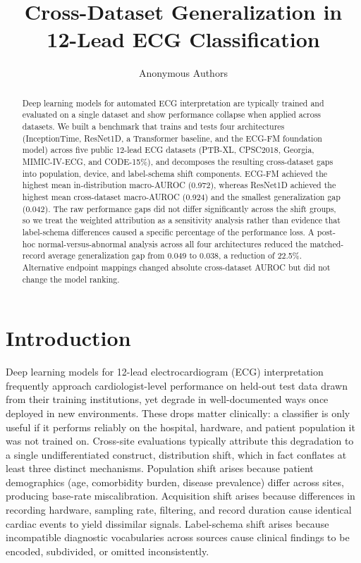\documentclass{article}
\title{Cross-Dataset Generalization in 12-Lead ECG Classification}
\author{Anonymous Authors}
\begin{document}
\maketitle

\begin{abstract}
Deep learning models for automated ECG interpretation are typically trained and evaluated on a single dataset and show performance collapse when applied across datasets. We built a benchmark that trains and tests four architectures (InceptionTime, ResNet1D, a Transformer baseline, and the ECG-FM foundation model) across five public 12-lead ECG datasets (PTB-XL, CPSC2018, Georgia, MIMIC-IV-ECG, and CODE-15\%), and decomposes the resulting cross-dataset gaps into population, device, and label-schema shift components. ECG-FM achieved the highest mean in-distribution macro-AUROC (0.972), whereas ResNet1D achieved the highest mean cross-dataset macro-AUROC (0.924) and the smallest generalization gap (0.042). The raw performance gaps did not differ significantly across the shift groups, so we treat the weighted attribution as a sensitivity analysis rather than evidence that label-schema differences caused a specific percentage of the performance loss. A post-hoc normal-versus-abnormal analysis across all four architectures reduced the matched-record average generalization gap from 0.049 to 0.038, a reduction of 22.5\%. Alternative endpoint mappings changed absolute cross-dataset AUROC but did not change the model ranking.
\end{abstract}

\section{Introduction}

Deep learning models for 12-lead electrocardiogram (ECG) interpretation frequently approach cardiologist-level performance on held-out test data drawn from their training institutions, yet degrade in well-documented ways once deployed in new environments. These drops matter clinically: a classifier is only useful if it performs reliably on the hospital, hardware, and patient population it was not trained on. Cross-site evaluations typically attribute this degradation to a single undifferentiated construct, distribution shift, which in fact conflates at least three distinct mechanisms. Population shift arises because patient demographics (age, comorbidity burden, disease prevalence) differ across sites, producing base-rate miscalibration. Acquisition shift arises because differences in recording hardware, sampling rate, filtering, and record duration cause identical cardiac events to yield dissimilar signals. Label-schema shift arises because incompatible diagnostic vocabularies across sources cause clinical findings to be encoded, subdivided, or omitted inconsistently.
\end{document}
